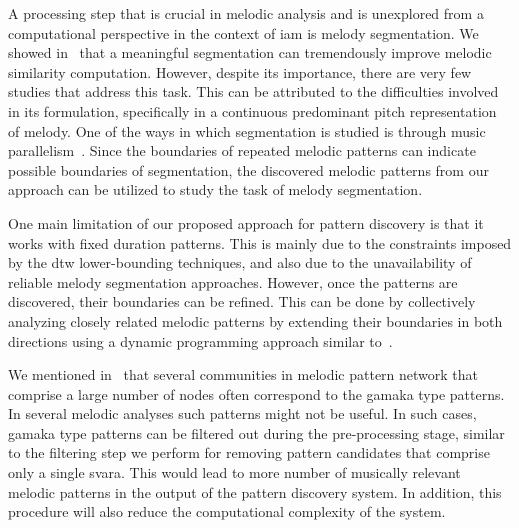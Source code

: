 A processing step that is crucial in melodic analysis and is unexplored from a computational perspective in the context of \gls{iam} is melody segmentation. We showed in~ that a meaningful segmentation can tremendously improve melodic similarity computation. However, despite its importance, there are very few studies that address this task. This can be attributed to the difficulties involved in its formulation, specifically in a continuous predominant pitch representation of melody. One of the ways in which segmentation is studied is through music parallelism~\citep{Cambouropoulos2006,rodriguez2014comparing}. Since the boundaries of repeated melodic patterns can indicate possible boundaries of segmentation, the discovered melodic patterns from our approach can be utilized to study the task of melody segmentation.   

One main limitation of our proposed approach for pattern discovery is that it works with fixed duration patterns. This is mainly due to the constraints imposed by the \gls{dtw} lower-bounding techniques, and also due to the unavailability of reliable melody segmentation approaches. However, once the patterns are discovered, their boundaries can be refined. This can be done by collectively analyzing closely related melodic patterns by extending their boundaries in both directions using a dynamic programming approach similar to~\cite{muscariello2009variability}.

We mentioned in~ that several communities in melodic pattern network that comprise a large number of nodes often correspond to the \gls{gamaka} type patterns. In several melodic analyses such patterns might not be useful. In such cases, \gls{gamaka} type patterns can be filtered out during the pre-processing stage, similar to the filtering step we perform for removing pattern candidates that comprise only a single \gls{svara}. This would lead to more number of musically relevant melodic patterns in the output of the pattern discovery system. In addition, this procedure will also reduce the computational complexity of the system.

